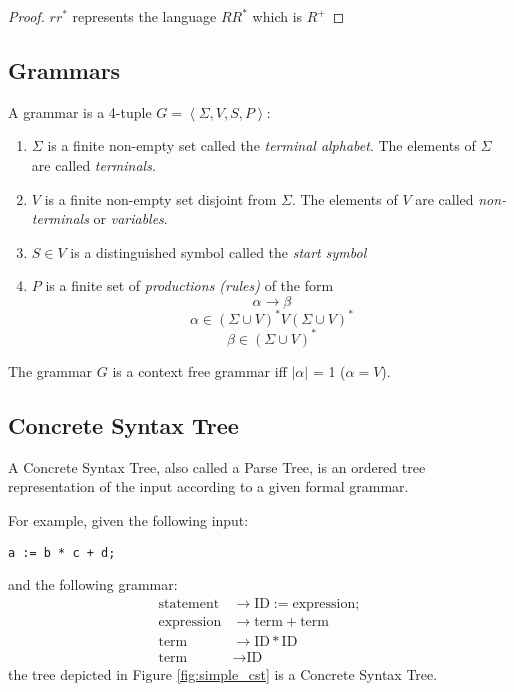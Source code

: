 \begin{proof}
  $r r^*$ represents the language $R R^*$ which is $R^+$
\end{proof}

\subsection{Grammars}

\begin{defn}[Grammar]
  A grammar is a 4-tuple $G = \left< \Sigma, V, S, P \right>$:
  \begin{enumerate}
  \item $\Sigma$ is a finite non-empty set called the \emph{terminal
    alphabet}. The elements of $\Sigma$ are called \emph{terminals}.
  \item $V$ is a finite non-empty set disjoint from $\Sigma$. The
    elements of $V$ are called \emph{non-terminals} or \emph{variables}.
  \item $S \in V$ is a distinguished symbol called the \emph{start symbol}
  \item $P$ is a finite set of \emph{productions (rules)} of the form
    $$ \alpha \rightarrow \beta $$
    $$ \alpha \in (\Sigma \cup V)^* V (\Sigma \cup V)^* $$
    $$ \beta \in (\Sigma \cup V)^* $$
  \end{enumerate}
\end{defn}

\begin{defn}
  The grammar $G$ is a context free grammar iff $|\alpha|$ = 1 ($\alpha = V$).
\end{defn}

\subsection{Concrete Syntax Tree}

A Concrete Syntax Tree, also called a Parse Tree, is an ordered tree
representation of the input according to a given formal grammar.

For example, given the following input:
\begin{lstlisting}
a := b * c + d;
\end{lstlisting}
and the following grammar:
\begin{align*}
  \textrm{statement}  & \rightarrow \textrm{ID} := \textrm{expression} ; \\
  \textrm{expression} & \rightarrow \textrm{term} + \textrm{term} \\
  \textrm{term}       & \rightarrow \textrm{ID} * \textrm{ID} \\
  \textrm{term}       & \rightarrow \textrm{ID}
\end{align*}
the tree depicted in Figure \ref{fig:simple_cst} is a Concrete Syntax Tree.

